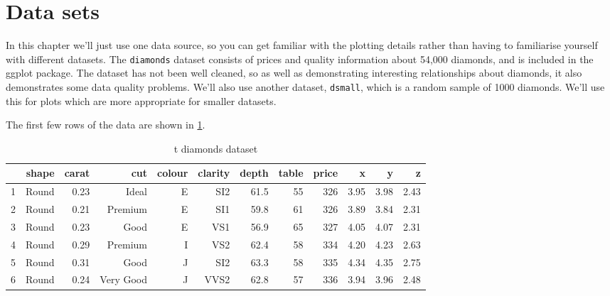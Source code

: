 \section{Data sets}\label{sec:data_sets}

In this chapter we'll just use one data source, so you can get familiar with the plotting details rather than having to familiarise yourself with different datasets.  The {\tt diamonds} dataset consists of prices and quality information about 54,000 diamonds, and is included in the ggplot package.  The dataset has not been well cleaned, so as well as demonstrating interesting relationships about diamonds, it also demonstrates some data quality problems.  We'll also use another dataset, {\tt dsmall}, which is a random sample of 1000 diamonds.  We'll use this for plots which are more appropriate for smaller datasets.

The first few rows of the data are shown in \ref{tab:diamonds}.

\begin{table}[ht]
\begin{center}
\begin{tabular}{l|rrrrrrrrrrr}
  \hline
 & shape & carat & cut & colour & clarity & depth & table & price & x & y & z \\
  \hline
1 & Round & 0.23 & Ideal & E & SI2 & 61.5 & 55 & 326 & 3.95 & 3.98 & 2.43 \\
  2 & Round & 0.21 & Premium & E & SI1 & 59.8 & 61 & 326 & 3.89 & 3.84 & 2.31 \\
  3 & Round & 0.23 & Good & E & VS1 & 56.9 & 65 & 327 & 4.05 & 4.07 & 2.31 \\
  4 & Round & 0.29 & Premium & I & VS2 & 62.4 & 58 & 334 & 4.20 & 4.23 & 2.63 \\
  5 & Round & 0.31 & Good & J & SI2 & 63.3 & 58 & 335 & 4.34 & 4.35 & 2.75 \\
  6 & Round & 0.24 & Very Good & J & VVS2 & 62.8 & 57 & 336 & 3.94 & 3.96 & 2.48 \\
   \hline
\end{tabular}
\caption{{	t diamonds} dataset}
\label{tab:diamonds}
\end{center}
\end{table}

